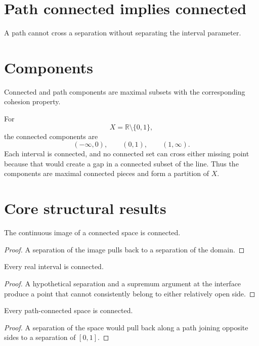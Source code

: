\section{Path connected implies connected}
A path cannot cross a separation without separating the interval parameter.

\section{Components}
Connected and path components are maximal subsets with the corresponding cohesion property.


\begin{example}\label{ex:ii07-expand-03}
For
\[
X=\mathbb R\setminus\{0,1\},
\]
the connected components are
\[
(-\infty,0),\qquad(0,1),\qquad(1,\infty).
\]
Each interval is connected, and no connected set can cross either missing point
because that would create a gap in a connected subset of the line. Thus the
components are maximal connected pieces and form a partition of \(X\).
\end{example}
\section{Core structural results}

\begin{theorem}\label{thm:ii07-01}
The continuous image of a connected space is connected.
\begin{proof}
A separation of the image pulls back to a separation of the domain.
\end{proof}
\end{theorem}

\begin{theorem}\label{thm:ii07-02}
Every real interval is connected.
\begin{proof}
A hypothetical separation and a supremum argument at the interface produce a point that cannot consistently belong to either relatively open side.
\end{proof}
\end{theorem}

\begin{theorem}\label{thm:ii07-03}
Every path-connected space is connected.
\begin{proof}
A separation of the space would pull back along a path joining opposite sides to a separation of $[0,1]$.
\end{proof}
\end{theorem}

